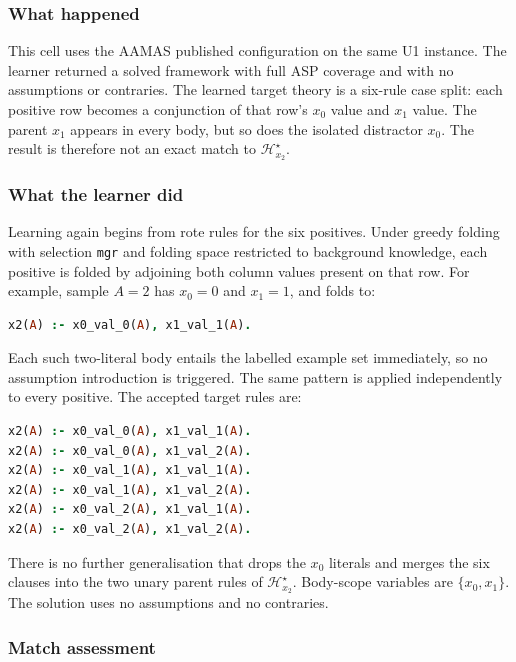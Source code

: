 \documentclass[11pt]{article}
\begin{document}
\subsubsection{What happened}

This cell uses the AAMAS published configuration on the same U1 instance. The learner
returned a solved framework with full ASP coverage and with no assumptions or
contraries. The learned target theory is a six-rule case split: each positive row
becomes a conjunction of that row's \(x_0\) value and \(x_1\) value. The parent \(x_1\)
appears in every body, but so does the isolated distractor \(x_0\). The result is
therefore not an exact match to \(\mathcal{H}_{x_2}^\star\).

\subsubsection{What the learner did}

Learning again begins from rote rules for the six positives. Under greedy folding with
selection \texttt{mgr} and folding space restricted to background knowledge, each
positive is folded by adjoining both column values present on that row. For example,
sample \(A=2\) has \(x_0=0\) and \(x_1=1\), and folds to:

\begin{lstlisting}[style=logic,language=Prolog]
x2(A) :- x0_val_0(A), x1_val_1(A).
\end{lstlisting}

Each such two-literal body entails the labelled example set immediately, so no
assumption introduction is triggered. The same pattern is applied independently to
every positive. The accepted target rules are:

\begin{lstlisting}[style=logic,language=Prolog]
x2(A) :- x0_val_0(A), x1_val_1(A).
x2(A) :- x0_val_0(A), x1_val_2(A).
x2(A) :- x0_val_1(A), x1_val_1(A).
x2(A) :- x0_val_1(A), x1_val_2(A).
x2(A) :- x0_val_2(A), x1_val_1(A).
x2(A) :- x0_val_2(A), x1_val_2(A).
\end{lstlisting}

There is no further generalisation that drops the \(x_0\) literals and merges the six
clauses into the two unary parent rules of \(\mathcal{H}_{x_2}^\star\). Body-scope
variables are \(\{x_0,x_1\}\). The solution uses no assumptions and no contraries.

\subsubsection{Match assessment}
\end{document}

